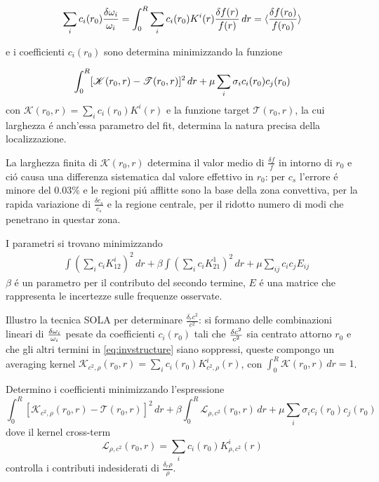 \documentclass[../main.tex]{subfiles}
\begin{document}
\begin{equation}\label{eq:SOLAfmean}
\sum_ic_i(r_0)\frac{\delta\omega_i}{\omega_i}=\int_0^R\sum_ic_i(r_0)K^i(r)\frac{\delta f(r)}{f(r)}\,dr=\langle \frac{\delta f(r_0)}{f(r_0)} \rangle
\end{equation}

e i coefficienti $c_i(r_0)$ sono determina minimizzando la funzione

\begin{equation}\label{eq:SOLAcir0min}
\int_0^R[\mathcal{K}(r_0,r)-\mathcal{T}(r_0,r)]^2\,dr+\mu\sum_i\sigma_ic_i(r_0)c_j(r_0)\\
\end{equation}
con $\mathcal{K}(r_0,r)=\sum_ic_i(r_0)K^i(r)$ e la funzione target $\mathcal{T}(r_0,r)$, la cui larghezza \'e anch'essa parametro del fit, determina la natura precisa della localizzazione.

La larghezza finita di $\mathcal{K}(r_0,r)$ determina il valor medio di $\frac{\delta f}{f}$ in intorno di $r_0$ e ci\'o causa una differenza sistematica  dal valore effettivo in $r_0$: per $c_s$ l'errore \'e minore del $0.03\%$ e le regioni pi\'u afflitte sono la base della zona convettiva, per la rapida variazione di $\frac{\delta c_s}{c_s}$ e la regione centrale, per il ridotto numero di modi che penetrano in questar zona.


\begin{errata}
I parametri si trovano minimizzando
\begin{align*}
&\int(\sum_ic_iK_{12}^i)^2\,dr+\beta\int(\sum_ic_iK_{21}^1)^2\,dr+\mu\sum_{ij}c_ic_jE_{ij}
\end{align*}
$\beta$ \'e un parametro per il contributo del secondo termine, $E$ \'e una matrice che rappresenta le incertezze sulle frequenze osservate.

\end{errata}

Illustro la tecnica SOLA per determinare $\frac{\delta_rc^2}{c^2}$: si formano delle combinazioni lineari di $\frac{\delta \omega_i}{\omega_i}$ pesate da coefficienti $c_i(r_0)$ tali che $\frac{\delta c^2}{c^2}$ sia centrato attorno $r_0$ e che gli altri termini in \eqref{eq:invstructure} siano soppressi, queste compongo un averaging kernel $\mathcal{K}_{c^2,\rho}(r_0,r)=\sum_ic_i(r_0)K_{c^2,\rho}^i(r)$, con $\int_0^R\mathcal{K}(r_0,r)\,dr=1$.

Determino i coefficienti minimizzando l'espressione
\begin{equation}
\int_0^R[\mathcal{K}_{c^2,\rho}(r_0,r)-\mathcal{T}(r_0,r)]^2\,dr+\beta\int_0^R\mathcal{L}_{\rho,c^2}(r_0,r)\,dr+\mu\sum_i\sigma_ic_i(r_0)c_j(r_0)
\end{equation}
dove il kernel cross-term
\begin{equation}
\mathcal{L}_{\rho,c^2}(r_0,r)=\sum_ic_i(r_0)K_{\rho,c^2}^i(r)
\end{equation}
controlla i contributi indesiderati di $\frac{\delta_r\rho}{\rho}$.
\end{document}
